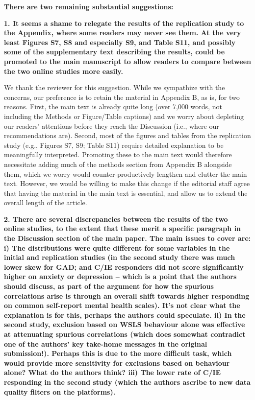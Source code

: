 \documentclass[a4paper,notitlepage,12pt]{article}
\begin{document}
\textbf{There are two remaining substantial suggestions:}

\textbf{1. It seems a shame to relegate the results of the replication study to the Appendix, where some readers may never see them. At the very least Figures S7, S8 and especially S9, and Table S11, and possibly some of the supplementary text describing the results, could be promoted to the main manuscript to allow readers to compare between the two online studies more easily.}

We thank the reviewer for this suggestion. While we sympathize with the concerns, our preference is to retain the material in Appendix B, as is, for two reasons. First, the main text is already quite long (over 7,000 words, not including the Methods or Figure/Table captions) and we worry about depleting our readers' attentions before they reach the Discussion (i.e., where our recommendations are). Second, most of the figures and tables from the replication study (e.g., Figures S7, S9; Table S11) require detailed explanation to be meaningfully interpreted. Promoting these to the main text would therefore necessitate adding much of the methods section from Appendix B alongside them, which we worry would counter-productively lengthen and clutter the main text. However, we would be willing to make this change if the editorial staff agree that having the material in the main text is essential, and allow us to extend the overall length of the article.

\textbf{2. There are several discrepancies between the results of the two online studies, to the extent that these merit a specific paragraph in the Discussion section of the main paper. The main issues to cover are: i) The distributions were quite different for some variables in the initial and replication studies (in the second study there was much lower skew for GAD; and C/IE responders did not score significantly higher on anxiety or depression – which is a point that the authors should discuss, as part of the argument for how the spurious correlations arise is through an overall shift towards higher responding on common self-report mental health scales). It's not clear what the explanation is for this, perhaps the authors could speculate. ii) In the second study, exclusion based on WSLS behaviour alone was effective at attenuating spurious correlations (which does somewhat contradict one of the authors' key take-home messages in the original submission!). Perhaps this is due to the more difficult task, which would provide more sensitivity for exclusions based on behaviour alone? What do the authors think? iii) The lower rate of C/IE responding in the second study (which the authors ascribe to new data quality filters on the platforms).}
\end{document}
